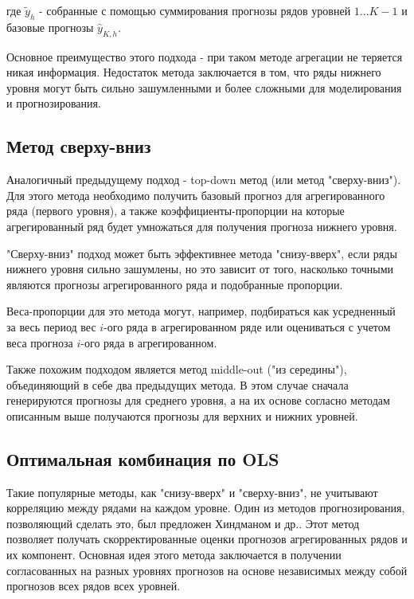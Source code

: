 \documentclass[12pt,a4paper, oneside]{extreport}
\begin{document}
 \noindent
где $\tilde{y}_h$  - собранные с помощью суммирования прогнозы рядов уровней $1...K-1$  и базовые прогнозы $\hat{y}_{K,h}$. 

Основное преимущество этого подхода - при таком методе агрегации не теряется никая информация. Недостаток метода заключается в том, что ряды нижнего уровня могут быть сильно зашумленными  и  более сложными для моделирования и прогнозирования\cite{weiss2018essays}.


\subsection{Метод сверху-вниз}

Аналогичный предыдущему подход - top-down метод (или метод "сверху-вниз"). Для этого метода необходимо получить базовый прогноз для агрегированного ряда (первого уровня), а также коэффициенты-пропорции на которые агрегированный ряд будет умножаться для получения прогноза нижнего уровня.   

"Сверху-вниз" подход может быть эффективнее метода "снизу-вверх", если ряды нижнего уровня сильно зашумлены, но это зависит от того, насколько точными являются прогнозы агрегированного ряда и подобранные пропорции. 

Веса-пропорции для это метода могут, например, подбираться 
как усредненный за весь период вес  $i$-ого  ряда в агрегированном ряде или оцениваться  с учетом веса прогноза $i$-ого  ряда в  агрегированном. 

Также похожим  подходом является метод middle-out ("из середины"), объединяющий в себе два предыдущих метода. В этом случае сначала генерируются прогнозы для среднего уровня, а на их основе согласно методам описанным выше получаются прогнозы для верхних и нижних уровней. 


\subsection{Оптимальная комбинация по OLS  }


Такие популярные методы, как "снизу-вверх" и "сверху-вниз",  не учитывают  корреляцию между  рядами на каждом уровне.  
Один из методов прогнозирования, позволяющий сделать это, был предложен Хиндманом и др.\cite{hyndman2011optimal}. 
Этот метод позволяет получать скорректированные  оценки  прогнозов агрегированных рядов и их компонент. Основная идея этого метода заключается в получении согласованных  на разных уровнях прогнозов на основе независимых между собой прогнозов всех рядов всех уровней. 
\end{document}
